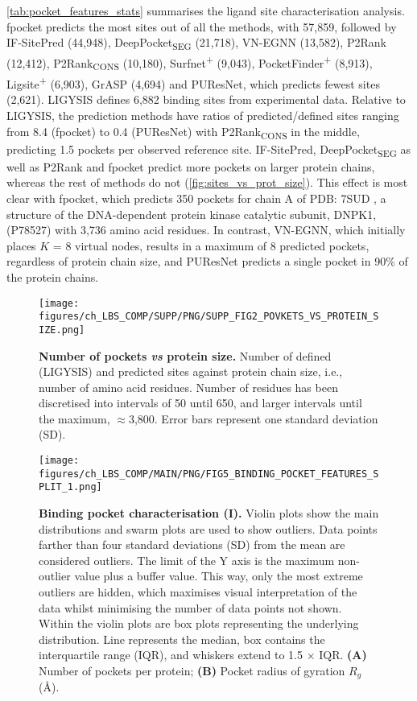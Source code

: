 \autoref{tab:pocket_features_stats} summarises the ligand site characterisation analysis. fpocket predicts the most sites out of all the methods, with 57,859, followed by IF-SitePred (44,948), DeepPocket\textsubscript{SEG} (21,718), VN-EGNN (13,582), P2Rank (12,412), P2Rank\textsubscript{CONS} (10,180), Surfnet\textsuperscript{+} (9,043), PocketFinder\textsuperscript{+} (8,913), Ligsite\textsuperscript{+} (6,903), GrASP (4,694) and PUResNet, which predicts fewest sites (2,621). LIGYSIS defines 6,882 binding sites from experimental data. Relative to LIGYSIS, the prediction methods have ratios of predicted/defined sites ranging from 8.4 (fpocket) to 0.4 (PUResNet) with P2Rank\textsubscript{CONS} in the middle, predicting 1.5 pockets per observed reference site. IF-SitePred, DeepPocket\textsubscript{SEG} as well as P2Rank and fpocket predict more pockets on larger protein chains, whereas the rest of methods do not (\autoref{fig:sites_vs_prot_size}). This effect is most clear with fpocket, which predicts 350 pockets for chain A of PDB: 7SUD \cite{LIU_2022_DNAPK}, a structure of the DNA-dependent protein kinase catalytic subunit, DNPK1, (P78527) with 3,736 amino acid residues. In contrast, VN-EGNN, which initially places $K$ = 8 virtual nodes, results in a maximum of 8 predicted pockets, regardless of protein chain size, and PUResNet predicts a single pocket in 90\% of the protein chains. 

\begin{figure}[ht!]
    \centering
    \texttt{[image: figures/ch\_LBS\_COMP/SUPP/PNG/SUPP\_FIG2\_POVKETS\_VS\_PROTEIN\_SIZE.png]}
    \caption[Number of pockets \textit{vs} protein size]{\textbf{Number of pockets \textit{vs} protein size.} Number of defined (LIGYSIS) and predicted sites against protein chain size, i.e., number of amino acid residues. Number of residues has been discretised into intervals of 50 until 650, and larger intervals until the maximum, $\approx$3,800. Error bars represent one standard deviation (SD).}
    \label{fig:sites_vs_prot_size}
\end{figure}

\begin{figure}[ht!]
    \centering
    \texttt{[image: figures/ch\_LBS\_COMP/MAIN/PNG/FIG5\_BINDING\_POCKET\_FEATURES\_SPLIT\_1.png]}
    \caption[Binding pocket characterisation (I)]{\textbf{Binding pocket characterisation (I).} Violin plots show the main distributions and swarm plots are used to show outliers. Data points farther than four standard deviations (SD) from the mean are considered outliers. The limit of the Y axis is the maximum non-outlier value plus a buffer value. This way, only the most extreme outliers are hidden, which maximises visual interpretation of the data whilst minimising the number of data points not shown. Within the violin plots are box plots representing the underlying distribution. Line represents the median, box contains the interquartile range (IQR), and whiskers extend to 1.5 $\times$ IQR. \textbf{(A)} Number of pockets per protein; \textbf{(B)} Pocket radius of gyration $R_{g}$ (\AA{}).}
    \label{fig:pocket_features_1}
\end{figure}


